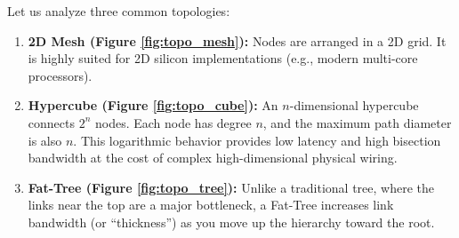 \documentclass[12pt,a4paper,openany]{book}
\begin{document}
Let us analyze three common topologies:
\begin{enumerate}
    \item \textbf{2D Mesh (Figure \ref{fig:topo_mesh}):} Nodes are arranged in a 2D grid. It is highly suited for 2D silicon implementations (e.g., modern multi-core processors).
    \item \textbf{Hypercube (Figure \ref{fig:topo_cube}):} An $n$-dimensional hypercube connects $2^n$ nodes. Each node has degree $n$, and the maximum path diameter is also $n$. This logarithmic behavior provides low latency and high bisection bandwidth at the cost of complex high-dimensional physical wiring.
    \item \textbf{Fat-Tree (Figure \ref{fig:topo_tree}):} Unlike a traditional tree, where the links near the top are a major bottleneck, a Fat-Tree increases link bandwidth (or ``thickness'') as you move up the hierarchy toward the root.
\end{enumerate}
\end{document}
